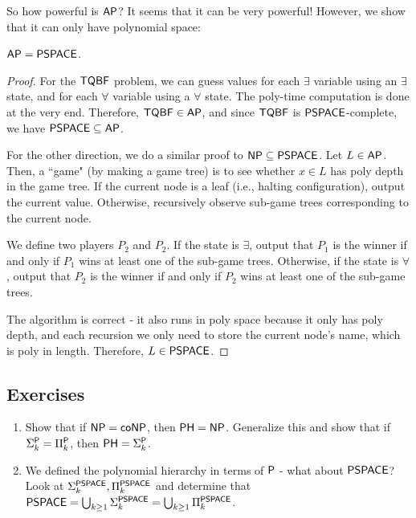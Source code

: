 So how powerful is $\AP$? It seems that it can be very powerful! However, we show that it can only have polynomial space:
\begin{theorem}
$\AP = \PSPACE$.
\end{theorem}

\begin{proof}
For the $\TQBF$ problem, we can guess values for each $\exists$ variable using an $\exists$ state, and for each $\forall$ variable using a $\forall$ state. The poly-time computation is done at the very end. Therefore, $\TQBF \in \AP$, and since $\TQBF$ is $\PSPACE$-complete, we have $\PSPACE \subseteq \AP$.

\par For the other direction, we do a similar proof to $\NP \subseteq \PSPACE$. Let $L \in \AP$. Then, a ``game" (by making a game tree) is to see whether $x \in L$ has poly depth in the game tree. If the current node is a leaf (i.e., halting configuration), output the current value. Otherwise, recursively observe sub-game trees corresponding to the current node. 

\par We define two players $P_2$ and $P_2$. If the state is $\exists$, output that $P_1$ is the winner if and only if $P_1$ wins at least one of the sub-game trees. Otherwise, if the state is $\forall$, output that $P_2$ is the winner if and only if $P_2$ wins at least one of the sub-game trees. 

\par The algorithm is correct - it also runs in poly space because it only has poly depth, and each recursion we only need to store the current node's name, which is poly in length. Therefore, $L \in \PSPACE$.
\end{proof}

\subsection{Exercises}
\begin{enumerate}

\item Show that if $\NP = \coNP$, then $\PH = \NP$. Generalize this and show that if $\Sigma_k^\P = \Pi_k^\P$, then $\PH = \Sigma_k^\P$. %

\item We defined the polynomial hierarchy in terms of $\P$ - what about $\PSPACE$? Look at $\Sigma_k^\PSPACE, \Pi_k^\PSPACE$ and determine that $\PSPACE = \bigcup_{k \ge 1} \Sigma_k^\PSPACE = \bigcup_{k \ge 1} \Pi_k^\PSPACE$.
\end{enumerate}